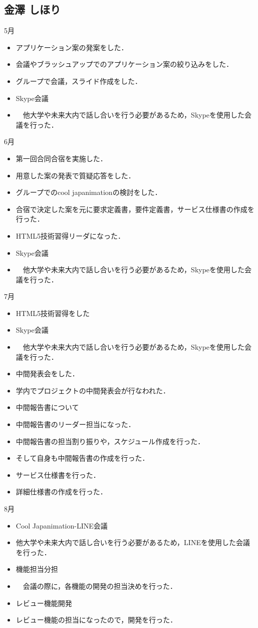 \subsection{金澤 しほり}
5月
\begin{itemize}
\item アプリケーション案の発案をした．
\item 会議やブラッシュアップでのアプリケーション案の絞り込みをした．
\item グループで会議，スライド作成をした．
\item Skype会議
\item 　他大学や未来大内で話し合いを行う必要があるため，Skypeを使用した会議を行った．
\end{itemize}
6月
\begin{itemize}
\item 第一回合同合宿を実施した．
\item 用意した案の発表で質疑応答をした．
\item グループでのcool japanimationの検討をした．
\item 合宿で決定した案を元に要求定義書，要件定義書，サービス仕様書の作成を行った．
\item HTML5技術習得リーダになった．
\item Skype会議
\item 　他大学や未来大内で話し合いを行う必要があるため，Skypeを使用した会議を行った．
\end{itemize}
7月
\begin{itemize}
\item HTML5技術習得をした
\item Skype会議
\item 　他大学や未来大内で話し合いを行う必要があるため，Skypeを使用した会議を行った．
\item 中間発表会をした．
\item 学内でプロジェクトの中間発表会が行なわれた．
\item 中間報告書について
\item   中間報告書のリーダー担当になった．
\item   中間報告書の担当割り振りや，スケジュール作成を行った．
\item   そして自身も中間報告書の作成を行った．
\item サービス仕様書を行った．
\item 詳細仕様書の作成を行った．
\end{itemize}
8月
\begin{itemize}
\item Cool Japanimation-LINE会議
\item   他大学や未来大内で話し合いを行う必要があるため，LINEを使用した会議を行った．
\item 機能担当分担
\item 　会議の際に，各機能の開発の担当決めを行った．
\item レビュー機能開発
\item   レビュー機能の担当になったので，開発を行った．
\end{itemize}

